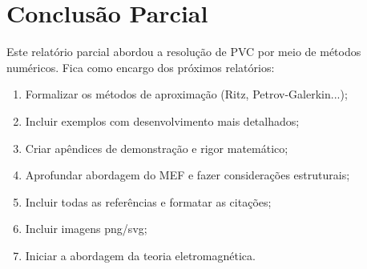 \section{Conclusão Parcial}
Este relatório parcial abordou a resolução de PVC por meio de métodos numéricos. Fica como encargo dos próximos relatórios:

\begin{enumerate}
\item Formalizar os métodos de aproximação (Ritz, Petrov-Galerkin...);
\item Incluir exemplos com desenvolvimento mais detalhados;
\item Criar apêndices de demonstração e rigor matemático;
\item Aprofundar abordagem do MEF e fazer considerações estruturais;
\item Incluir todas as referências e formatar as citações;
\item Incluir imagens png/svg;
\item Iniciar a abordagem da teoria eletromagnética.
\end{enumerate}